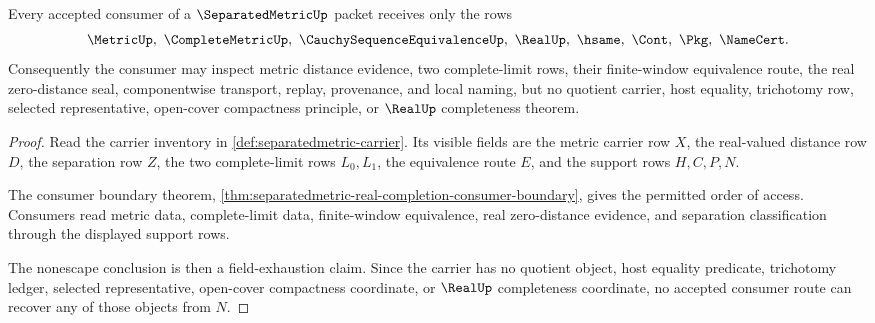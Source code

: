 \begin{theorem}\label{thm:separatedmetric-consumer-nonescape-scope}
Every accepted consumer of a $\SeparatedMetricUp$ packet receives only the rows
$$
\MetricUp,\ \CompleteMetricUp,\ \CauchySequenceEquivalenceUp,\ \RealUp,\ \hsame,\ \Cont,\ \Pkg,\ \NameCert .
$$
Consequently the consumer may inspect metric distance evidence, two complete-limit rows, their finite-window equivalence route, the real zero-distance seal, componentwise transport, replay, provenance, and local naming, but no quotient carrier, host equality, trichotomy row, selected representative, open-cover compactness principle, or $\RealUp$ completeness theorem.
\end{theorem}
\begin{proof}
Read the carrier inventory in \autoref{def:separatedmetric-carrier}. Its visible fields are the metric carrier row $X$, the real-valued distance row $D$, the separation row $Z$, the two complete-limit rows $L_0,L_1$, the equivalence route $E$, and the support rows $H,C,P,N$.

The consumer boundary theorem, \autoref{thm:separatedmetric-real-completion-consumer-boundary}, gives the permitted order of access. Consumers read metric data, complete-limit data, finite-window equivalence, real zero-distance evidence, and separation classification through the displayed support rows.

The nonescape conclusion is then a field-exhaustion claim. Since the carrier has no quotient object, host equality predicate, trichotomy ledger, selected representative, open-cover compactness coordinate, or $\RealUp$ completeness coordinate, no accepted consumer route can recover any of those objects from $N$.
\end{proof}

